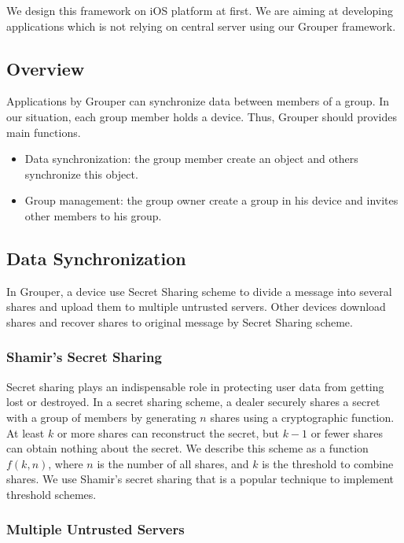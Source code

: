 \documentclass[twocolumn,10pt]{article}
\begin{document}
We design this framework on iOS platform at first. We are aiming at developing applications which is not relying on central server using our Grouper framework. 

\subsection{Overview}
Applications by Grouper can synchronize data between members of a group. In our situation, each group member holds a device. Thus, Grouper should provides main functions.

\begin{itemize}
	\setlength{\itemsep}{1pt}
	\setlength{\parskip}{0pt}
	\setlength{\parsep}{0pt}
	\item Data synchronization: the group member create an object and others synchronize this object.
	\item Group management: the group owner create a group in his device and invites other members to his group.
\end{itemize}

\subsection{Data Synchronization}

In Grouper, a device use Secret Sharing scheme to divide a message into several shares and upload them to multiple untrusted servers. Other devices download shares and recover shares to original message by Secret Sharing scheme.

\subsubsection{Shamir's Secret Sharing}
Secret sharing plays an indispensable role in protecting user data from getting lost or destroyed. In a secret sharing scheme, a dealer securely shares a secret with a group of members by generating $n$ shares using a cryptographic function\cite{smith2013layered}. At least $k$ or more shares can reconstruct the secret, but $k-1$ or fewer shares can obtain nothing about the secret\cite{pang2005new}. We describe this scheme as a function $f(k, n)$, where $n$ is the number of all shares, and $k$ is the threshold to combine shares.  We use Shamir's secret sharing that  is a popular technique to implement threshold schemes.

\subsubsection{Multiple Untrusted Servers}
\end{document}
